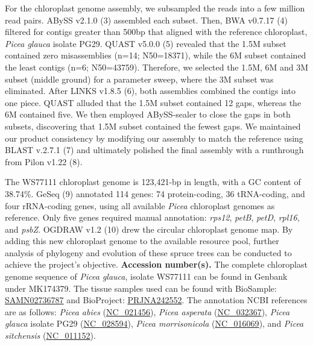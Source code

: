 \documentclass[titlepage,11pt, oneside]{article}   	%
\begin{document}
\newline
\par
For the chloroplast genome assembly, we subsampled the reads into a few million read pairs. ABySS v2.1.0 (3) assembled each subset. Then, BWA v0.7.17 (4) filtered for contigs greater than 500bp that aligned with the reference chloroplast, \textit{Picea glauca} isolate PG29. QUAST v5.0.0 (5) revealed that the 1.5M subset contained zero misassemblies (n=14; N50=18371), while the 6M subset contained the least contigs (n=6; N50=43759). Therefore, we selected the 1.5M, 6M and 3M subset (middle ground) for a parameter sweep, where the 3M subset was eliminated. After LINKS v1.8.5 (6), both assemblies combined the contigs into one piece. QUAST alluded that the 1.5M subset contained 12 gaps, whereas the 6M contained five. We then employed ABySS-sealer to close the gaps in both subsets, discovering that 1.5M subset contained the fewest gaps. We maintained our product consistency by modifying our assembly to match the reference using BLAST v.2.7.1 (7) and ultimately polished the final assembly with a runthrough from Pilon v1.22 (8).
\newline
\par
The WS77111 chloroplast genome is 123,421-bp in length, with a GC content of 38.74\%. GeSeq (9) annotated 114 genes: 74 protein-coding, 36 tRNA-coding, and four rRNA-coding genes, using all available \textit{Picea} chloroplast genomes as reference. Only five genes required manual annotation: \textit{rps12}, \textit{petB}, \textit{petD}, \textit{rpl16}, and \textit{psbZ}. OGDRAW v1.2 (10) drew the circular chloroplast genome map. By adding this new chloroplast genome to the available resource pool, further analysis of phylogeny and evolution of these spruce trees can be conducted to achieve the project’s objective.
\newline
\newline
\textbf{Accession number(s).} The complete chloroplast genome sequence of \textit{Picea glauca}, isolate WS77111 can be found in Genbank under MK174379. The tissue samples used can be found with BioSample: \href{https://www.ncbi.nlm.nih.gov/biosample/?term=SAMN02736787}{SAMN02736787} and BioProject: \href{https://www.ncbi.nlm.nih.gov/bioproject/?term=PRJNA242552}{PRJNA242552}. The annotation NCBI references are as follows: \textit{Picea abies} (\href{https://www.ncbi.nlm.nih.gov/nuccore/NC_021456}{NC\_021456}), \textit{Picea asperata} (\href{https://www.ncbi.nlm.nih.gov/nuccore/NC_032367}{NC\_032367}), \textit{Picea glauca} isolate PG29 (\href{https://www.ncbi.nlm.nih.gov/nuccore/NC_028594}{NC\_028594}), \textit{Picea morrisonicola} (\href{https://www.ncbi.nlm.nih.gov/nuccore/NC_016069}{NC\_016069}), and \textit{Picea sitchensis }(\href{https://www.ncbi.nlm.nih.gov/nuccore/NC_011152}{NC\_011152}).
\end{document}
